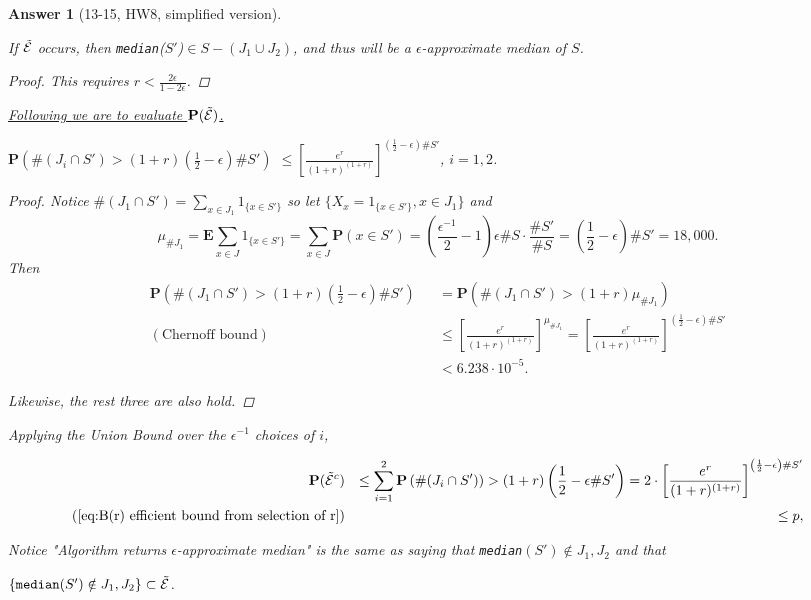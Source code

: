 \documentclass[11pt]{article}
\theoremstyle{numberplain}
\theoremstyle{nonumberplain}
\newtheorem{proof}{Proof}
\newtheorem{ans}{Answer}
\newcommand{\0}{{\mathbf{0}}}
\newcommand{\E}{{\mathbf{E}}}
\renewcommand{\P}{{\mathbf{P}}}
\begin{document}
\begin{ans}[13-15, HW8, simplified version]
\begin{claim}If $\tilde{{\cal E}}$ occurs, then
{\tt median}($S'$)$\in S-(J_1\cup J_2)$,
and thus will be a $\epsilon$-approximate median of $S$.
\label{eq:requirement for r II}
\end{claim}
\begin{proof}
This requires $r < \frac{2\epsilon  }{1-2\epsilon}$.
\end{proof}


\underline{Following we are to evaluate $\P(\ev)$.}

\begin{claim}
$\P\left(\#(J_i\cap S') > (1+r)\left(\frac{1}{2}-\epsilon\right) \#S'\right)$ 
$\leq \left[ \frac{e^{r}}{(1+r)^{(1+r)}} \right]^{  \left(\frac{1}{2}-\epsilon \right)\# S' } $, $i=1,2$.
\end{claim}
\begin{proof}
Notice $\#(J_1\cap S')=\sum_{x\in J_1}1_{\{x\in S'\}}$ so let $\{X_{x}=1_{\{x\in S'\}},x\in J_1\}
$
and 
$$\mu_{\# J_1}=\E \sum_{x\in J}1_{\{x\in S'\}}=\sum_{x\in J}\P(x\in S')=\left(\frac{\epsilon^{-1}}{2}-1 \right)\epsilon \# S\cdot \frac{\# S'}{\# S}=\left(\frac{1}{2}-\epsilon \right)\# S'=18,000.$$
Then 
\begin{eqnarray*}
\P\left( \#( J_1 \cap S')> (1+r)\left(\frac{1}{2}-\epsilon\right)\# S' \right)&& =\P\left( \#(J_1\cap S')> (1+r)\mu_{\# J_1} \right)\\
(\text{Chernoff bound}) && \leq \left[ \frac{e^{r}}{(1+r)^{(1+r)}} \right]^{\mu_{\# J_1}}=\left[ \frac{e^{r}}{(1+r)^{(1+r)}} \right]^{  \left(\frac{1}{2}-\epsilon \right)\# S' } \\
&& < 6.238\cdot 10^{-5}.
\end{eqnarray*}



Likewise, the rest three are also hold.
\end{proof}	

Applying the Union Bound over the $\epsilon^{-1}$ choices of $i$,

\begin{eqnarray*}
\P(\ev^c)&&\leq \sum_{i=1}^{2}%
\P\left(\#(J_i\cap S')\right) > (1+r)\left(\frac{1}{2}-\epsilon \#S' \right)
 =2\cdot \left[ \frac{e^{r}}{(1+r)^{(1+r)}} \right]^{  \left(\frac{1}{2}-\epsilon \right)\# S' } \\
\text{(\ref{eq:B(r) efficient bound from selection of r})} &&
\leq p,
\end{eqnarray*}

Notice "Algorithm returns $ \epsilon$-approximate median" is the same as saying that {\tt median}$(S')\notin J_1,J_2$ and that

$\{{\tt median}(S')\notin J_1, J_2\} 
 \subset \tilde{{\cal E}}
$.

\end{ans}
\end{document}
